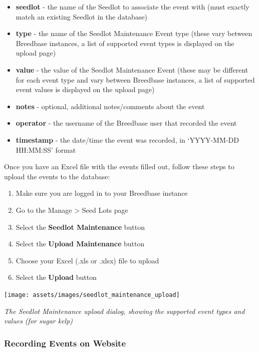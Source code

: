 \documentclass[
  12pt,
]{book}
\providecommand{\tightlist}{%
  \setlength{\itemsep}{0pt}\setlength{\parskip}{0pt}}
\begin{document}
\begin{itemize}
\tightlist
\item
  \textbf{seedlot} - the name of the Seedlot to associate the event with (must exactly match an existing Seedlot in the database)
\item
  \textbf{type} - the name of the Seedlot Maintenance Event type (these vary between Breedbase instances, a list of supported event types is displayed on the upload page)
\item
  \textbf{value} - the value of the Seedlot Maintenance Event (these may be different for each event type and vary between Breedbase instances, a list of supported event values is displayed on the upload page)
\item
  \textbf{notes} - optional, additional notes/comments about the event
\item
  \textbf{operator} - the username of the Breedbase user that recorded the event
\item
  \textbf{timestamp} - the date/time the event was recorded, in `YYYY-MM-DD HH:MM:SS' format
\end{itemize}

Once you have an Excel file with the events filled out, follow these steps to upload the events to the database:

\begin{enumerate}
\def\labelenumi{\arabic{enumi}.}
\tightlist
\item
  Make sure you are logged in to your Breedbase instance
\item
  Go to the Manage \textgreater{} Seed Lots page
\item
  Select the \textbf{Seedlot Maintenance} button
\item
  Select the \textbf{Upload Maintenance} button
\item
  Choose your Excel (.xls or .xlsx) file to upload
\item
  Select the \textbf{Upload} button
\end{enumerate}

\begin{center}\texttt{[image: assets/images/seedlot\_maintenance\_upload]} \end{center}

\emph{The Seedlot Maintenance upload dialog, showing the supported event types and values (for sugar kelp)}

\hypertarget{recording-events-on-website}{%
\subsubsection*{Recording Events on Website}\label{recording-events-on-website}}
\end{document}
